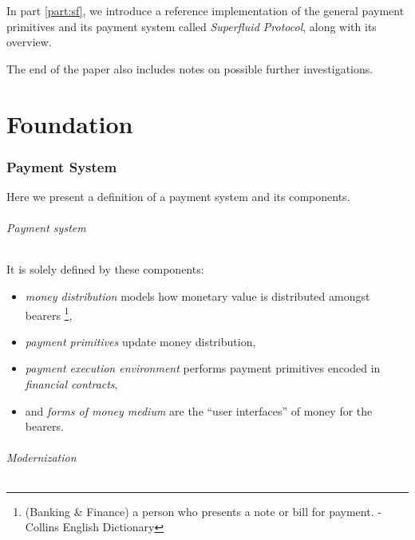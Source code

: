 In part \ref{part:sf}, we introduce a reference implementation of the general payment primitives and
its payment system called \textit{Superfluid Protocol}, along with its overview.

The end of the paper also includes notes on possible further investigations.

\part{Foundation}\label{part:foundation}

\section{Payment System}

Here we present a definition of a payment system and its components.

\paragraph{Payment system}

It is solely defined by these components:

\begin{itemize}
    \item \textit{money distribution} models how monetary value is distributed amongst
bearers \footnote{(Banking \& Finance) a person who presents a note or bill for payment. - Collins
English Dictionary},

    \item \textit{payment primitives} update money distribution,

    \item \textit{payment execution environment} performs payment primitives encoded
    in \textit{financial contracts},

    \item and \textit{forms of money medium} are the ``user interfaces'' of money for the bearers.
\end{itemize}

\paragraph{Modernization}

